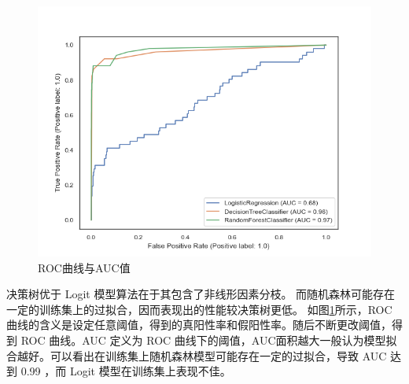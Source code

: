 \begin{figure}[H]
	\centering
	\includegraphics[width=.7\linewidth]{./data/roc.png}
	\caption{\label{fig:roc}ROC曲线与AUC值}
\end{figure}

决策树优于 Logit 模型算法在于其包含了非线形因素分枝。
而随机森林可能存在一定的训练集上的过拟合，因而表现出的性能较决策树更低。
如图\ref{fig:roc}所示，ROC 曲线的含义是设定任意阈值，得到的真阳性率和假阳性率。随后不断更改阈值，得到 ROC 曲线。AUC 定义为 ROC 曲线下的阈值，AUC面积越大一般认为模型拟合越好。可以看出在训练集上随机森林模型可能存在一定的过拟合，导致 AUC 达到 0.99 ，而 Logit 模型在训练集上表现不佳。
